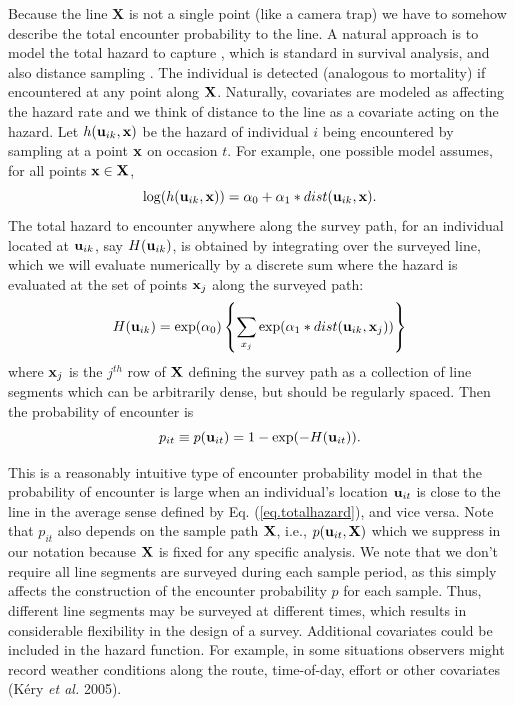 Because the line {\bf X} is not a single point (like a camera trap) we
have to somehow describe the total encounter probability to the
line. A natural approach is to model the total hazard to capture
\citep{borchers_efford:2008}, which is standard in survival analysis,
and also distance sampling \citep{hayes_buckland:1983,
  skaug_schweder:1999}.  The individual is detected (analogous to
mortality) if encountered at any point along ${\bf X}$. Naturally,
covariates are modeled as affecting the hazard rate and we think of
distance to the line as a covariate acting on the hazard. Let $h({\bf
  u}_{ik},{\bf x})$ be the hazard of individual $i$ being encountered
by sampling at a point ${\bf x}$ on occasion $t$.  For example, one
possible model assumes, for all points ${\bf x} \in {\bf X}$,
\begin{equation}
\log(h({\bf u}_{ik},{\bf x})) = \alpha_{0} + \alpha_{1}*dist({\bf u}_{ik},{\bf x}).
\label{eq.hazard}
\end{equation}
The total hazard to encounter anywhere along the survey path, for an
individual located at ${\bf u}_{ik}$, say $H({\bf u}_{ik})$, is
obtained by integrating over the surveyed line, which we will evaluate
numerically by a discrete sum where the hazard is evaluated at the set
of points ${\bf x}_{j}$ along the surveyed path:
\begin{equation}
H({\bf u}_{ik}) =  \exp(\alpha_{0}) \left\{ \sum_{x_{j}}  \exp(\alpha_{1}*dist({\bf
    u}_{ik},{\bf x}_{j})) \right\}
\label{eq.totalhazard}
\end{equation}
where ${\bf x}_{j}$ is the $j^{th}$ row of ${\bf X}$ defining the
survey path as a collection of line segments which can be arbitrarily
dense, but should be regularly spaced.  Then the probability of
encounter is
\begin{equation}
p_{it} \equiv p({\bf u}_{it}) = 1- \exp(-H({\bf u}_{it})).
\label{search-encounter.eq.encounterprob}
\end{equation}

This is a reasonably intuitive type of encounter probability model in
that the probability of encounter is large when an individual's
location ${\bf u}_{it}$ is close to the line in the average sense
defined by Eq. (\ref{eq.totalhazard}), and vice versa. Note that
$p_{it}$ also depends on the sample path ${\bf X}$, i.e., $p({\bf
  u}_{it}, {\bf X})$ which we suppress in our notation because ${\bf
  X}$ is fixed for any specific analysis.  We note that we don't
require all line segments are surveyed during each sample period, as
this simply affects the construction of the encounter probability $p$
for each sample. Thus, different line segments may be surveyed at
different times, which results in considerable flexibility in the
design of a survey. Additional covariates could be included in the
hazard function. For example, in some situations observers might
record weather conditions along the route, time-of-day, effort or
other covariates (K\'{e}ry {\it et al.} 2005).


